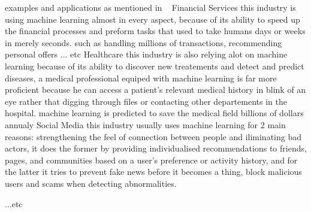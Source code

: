     examples and applications
        as mentioned in ~\cite{ml}
        Financial Services
            this industry is using machine learning almost in every aspect, because of its ability to speed up the financial processes and preform tasks that used to take humans days or weeks in merely seconds. such as handling millions of transactions, recommending personal offers ... etc
        Healthcare
            this industry is also relying alot on machine learning because of its ability to discover new treatements and detect and predict diseases, a medical professional equiped with machine learning is far more proficient because he can access a patient's relevant medical history in blink of an eye rather that digging through files or contacting other departements in the hospital. machine learning is predicted to save the medical field billions of dollars annualy
        Social Media
            this industry usually uses machine learning for 2 main reasons: strengthening the feel of connection between people and iliminating bad actors, it does the former by providing individualised recommendations to friends, pages, and communities based on a user's preference or activity history, and for the latter it tries to prevent fake news before it becomes a thing, block malicious users and scams when detecting abnormalities.

        ...etc

